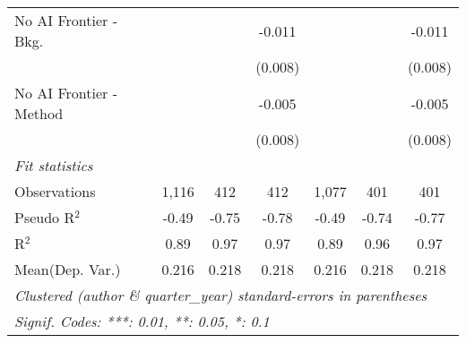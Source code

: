 \begin{tabular}{lcccccc}
   No AI Frontier - Bkg.   &         &               & -0.011        &         &               & -0.011\\   
                           &         &               & (0.008)       &         &               & (0.008)\\   
   No AI Frontier - Method &         &               & -0.005        &         &               & -0.005\\   
                           &         &               & (0.008)       &         &               & (0.008)\\   
   \midrule
   \emph{Fit statistics}\\
   Observations            & 1,116   & 412           & 412           & 1,077   & 401           & 401\\  
   Pseudo R$^2$            & -0.49   & -0.75         & -0.78         & -0.49   & -0.74         & -0.77\\  
   R$^2$                   & 0.89    & 0.97          & 0.97          & 0.89    & 0.96          & 0.97\\  
Mean(Dep. Var.) & 0.216 & 0.218 & 0.218 & 0.216 & 0.218 & 0.218 \\
   \midrule \midrule
   \multicolumn{7}{l}{\emph{Clustered (author \& quarter\_year) standard-errors in parentheses}}\\
   \multicolumn{7}{l}{\emph{Signif. Codes: ***: 0.01, **: 0.05, *: 0.1}}\\
\end{tabular}
\par\endgroup
